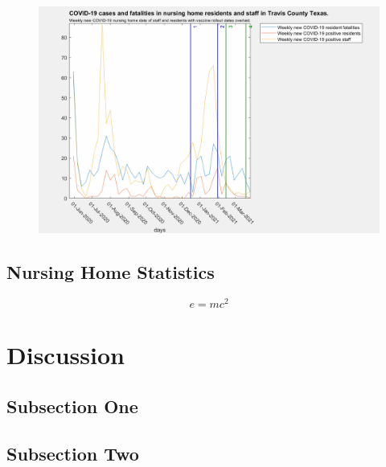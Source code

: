 \documentclass[twoside]{article}
\begin{document}
\begin{multicols}{2}
\begin{figure}[H]
	\includegraphics[width=\linewidth]{images/travis_nursing_home_with_vaccine.png}
	\caption{}
	\label{fig:images/travis_nursing_home_with_vaccineLabel}
\end{figure}

\subsection{Nursing Home Statistics}

\lipsum[5] %

\begin{equation}
\label{eq:emc}
e = mc^2
\end{equation}

\lipsum[6] %


\section{Discussion}

\subsection{Subsection One}

\lipsum[7] %

\subsection{Subsection Two}

\lipsum[8] %



\end{multicols}
\end{document}
